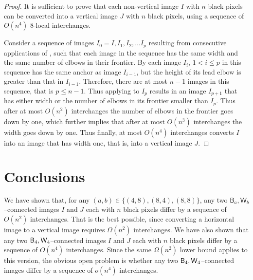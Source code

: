 \documentclass[lotsofwhite,charterfonts]{patmorin}
\newcommand{\fourfour}{\ensuremath{\protect\textup{\textsf{B}}_{4},\protect\textup{\textsf{W}}_{4}}}
\begin{document}
\begin{proof}
It is sufficient to prove that each non-vertical image $I$ with $n$ black pixels can be converted into a vertical image $J$ with $n$ black pixels, using a sequence of $O(n^4)$ 8-local interchanges. 

Consider a sequence of images $I_0=I, I_1, I_2, \dots I_p$ resulting from consecutive applications of , such that each image in the sequence has the same width and the same number of elbows in their frontier. By  each image $I_i$, $1<i\leq p$ in this sequence has the same anchor as image $I_{i-1}$, but the height of its lead elbow is greater than that in $I_{i-1}$. Therefore, there are at most $n-1$ images in this sequence, that is $p\leq n-1$. Thus applying  to $I_p$ results in an image $I_{p+1}$ that has either width or the number of elbows in its frontier smaller than $I_p$. Thus after at most $O(n^2)$ interchanges the number of elbows in the frontier goes down by one, which further implies that after at most $O(n^3)$ interchanges the width goes down by one. Thus finally, at most $O(n^4)$ interchanges converts $I$ into an image that has width one, that is, into a vertical image $J$.
\end{proof}


\section{Conclusions} 

We have shown that, for any $(a,b)\in\{(4,8),(8,4),(8,8)\}$, any two $\textsf{B}_a,\textsf{W}_b$--connected images $I$ and $J$ each with $n$ black pixels differ by a sequence of $O(n^2)$ interchanges. That is the best possible, since converting a horizontal image to a vertical image requires $\Omega(n^2)$ interchanges. We have also shown that any two \fourfour--connected images $I$ and $J$ each with $n$ black pixels differ by a sequence of $O(n^4)$ interchanges. Since the same $\Omega(n^2)$ lower bound applies to this version, the obvious open problem is whether any two \fourfour--connected images  differ by a sequence of $o(n^4)$ interchanges.









%
\end{document}
